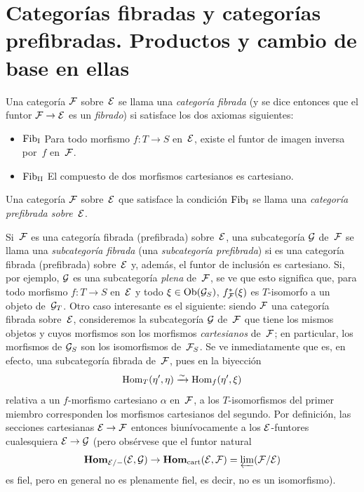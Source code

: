 \section[Categorías fibradas y categorías prefibradas]{Categorías fibradas y
categorías prefibradas. Productos y cambio de base en ellas}
\label{VI.6}

\begin{definition}
\label{VI.6.1}
Una categoría $\cal{F}$ sobre~$\cal{E}$ se llama una
\emph{categoría fibrada}
%
(y se dice entonces que el funtor $\cal{F}\to\cal{E}$ es un
\emph{fibrado})
%
si satisface los dos axiomas siguientes:
\begin{itemize}
\item{$\Fib_{\mathrm{I}}$}
Para todo morfismo $f\colon T\to S$ en~$\cal{E}$, existe el funtor de
imagen inversa por~$f$ en~$\cal{F}$.
\item{$\Fib_{\mathrm{II}}$} El compuesto de dos morfismos cartesianos es
cartesiano.
\end{itemize}
Una categoría $\cal{F}$ sobre~$\cal{E}$ que satisface la condición
$\Fib_{\mathrm{I}}$ se llama una \emph{categoría prefibrada sobre~$\cal{E}$}.
%
\end{definition}

Si~$\cal{F}$ es una categoría fibrada (\resp prefibrada) sobre~$\cal{E}$,
una subcategoría $\cal{G}$ de~$\cal{F}$ se llama una
\emph{subcategoría fibrada}
%
(\resp una \emph{subcategoría prefibrada}) si es una categoría fibrada
(\resp prefibrada) sobre~$\cal{E}$ y, además, el funtor de inclusión es
cartesiano. Si, por ejemplo, $\cal{G}$ es una subcategoría \emph{plena}
de~$\cal{F}$, se ve que esto significa que, para todo morfismo
$f\colon T\to S$ en~$\cal{E}$ y todo $\xi\in\Ob(\cal{G}_S)$,
$f^*_{\cal{F}}(\xi)$ es $T$-isomorfo a un objeto de~$\cal{G}_T$. Otro
caso interesante es el siguiente: siendo $\cal{F}$ una categoría fibrada
sobre~$\cal{E}$, consideremos la subcategoría $\cal{G}$ de~$\cal{F}$ que
tiene los mismos objetos y cuyos morfismos son los morfismos
\emph{cartesianos} de~$\cal{F}$; en particular, los morfismos de
$\cal{G}_S$ son los isomorfismos de~$\cal{F}_S$. Se ve inmediatamente que
es, en efecto, una subcategoría fibrada de~$\cal{F}$, pues en la biyección
$$
\Hom_T(\eta',\eta) \isomto \Hom_f(\eta',\xi)
$$
relativa a un $f$-morfismo cartesiano $\alpha$ en~$\cal{F}$, a los
$T$-isomorfismos del primer miembro corresponden los morfismos cartesianos
del segundo. Por definición, las secciones cartesianas
$\cal{E}\to\cal{F}$
entonces biunívocamente a los $\cal{E}$-funtores cualesquiera
$\cal{E}\to\cal{G}$ (pero obsérvese que el funtor natural
$$
\SheafHom_{\cal{E}/-}(\cal{E},\cal{G})\to
\SheafHom_\cart(\cal{E},\cal{F})=
\varprojLim(\cal{F}/\cal{E})
$$
es fiel, pero en general no es plenamente fiel, es decir, no es un
isomorfismo).

